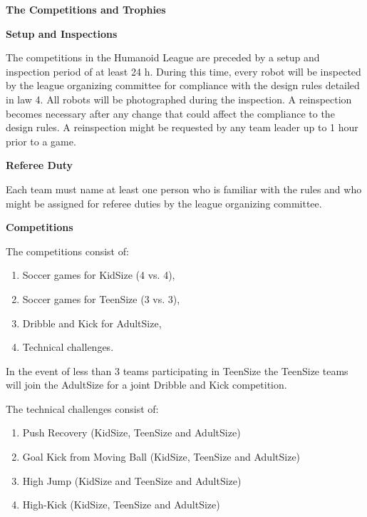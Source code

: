 \clearpage
\sffamily
{\bfseries\color[rgb]{0.4,0.4,0.4}The Competitions and Trophies}

\bigskip

{\bfseries Setup and Inspections}

\headlinebox

The competitions in the Humanoid League are preceded by a setup and inspection period of at least 24 h. During this time, every robot will be inspected by the league organizing committee for compliance with the design rules detailed in law 4. All robots will be photographed during
the inspection. A reinspection becomes necessary after any change that could affect the compliance to the design rules. A reinspection might be requested by any team leader up to 1 hour prior to a game.

\bigskip

{\bfseries Referee Duty}

\headlinebox

Each team must name at least one person who is familiar with the rules and who might be assigned for referee duties by the league organizing committee.

\bigskip

{\bfseries Competitions}

\headlinebox

The competitions consist of:

\begin{enumerate}
\item Soccer games for KidSize (4 vs. 4),
\item Soccer games for TeenSize (3 vs. 3),
\item Dribble and Kick for AdultSize,
\item Technical challenges.
\end{enumerate}

\bigskip

In the event of less than 3 teams participating in TeenSize the TeenSize teams will join the AdultSize for a joint Dribble and Kick competition.

\bigskip

The technical challenges consist of:

\begin{enumerate}
\item Push Recovery (KidSize, TeenSize and AdultSize)
\item Goal Kick from Moving Ball (KidSize, TeenSize and AdultSize)
\item High Jump (KidSize and TeenSize and AdultSize)
\item High-Kick (KidSize, TeenSize and AdultSize)
\end{enumerate}

